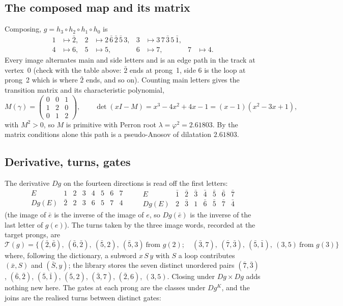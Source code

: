 \documentclass[12pt]{amsart}
\newcommand{\anti}[1]{\bar{#1}}          %
\newcommand{\Dg}{D}                       %
\newcommand{\turns}{\mathcal{T}}
\newcommand{\lam}{\lambda}
\newcommand{\set}[1]{\{#1\}}
\theoremstyle{plain}
\theoremstyle{definition}
\begin{document}
\subsection{The composed map and its matrix}
Composing, $g=h_3\circ h_2\circ h_1\circ h_0$ is
\begin{align*}
  1&\mapsto \anti2, &
  2&\mapsto 2\,\anti6\,\anti2\,\anti5\,3, &
  3&\mapsto 3\,7\,\anti3\,5\,\anti1, \\
  4&\mapsto 6, & 5&\mapsto 5, & 6&\mapsto 7, & 7&\mapsto 4.
\end{align*}
Every image alternates main and side letters and is an edge path in the
track at vertex~0 (check with the table above: $\anti2$ ends at prong~1,
side $6$ is the loop at prong~2 which is where $\anti2$ ends, and so on).
Counting main letters gives the transition matrix and its characteristic
polynomial,
\[
  M(\gamma)=\begin{pmatrix} 0&0&1\\ 1&2&0\\ 0&1&2 \end{pmatrix},
  \qquad
  \det(xI-M)=x^3-4x^2+4x-1=(x-1)(x^2-3x+1),
\]
with $M^2>0$, so $M$ is primitive with Perron root
$\lam=\varphi^2=2.61803$.  By the matrix conditions alone this path is a
pseudo-Anosov of dilatation $2.61803$.

\subsection{Derivative, turns, gates}
The derivative $\Dg g$ on the fourteen directions is read off the first
letters:
\[
  \begin{array}{c|ccccccc}
    E & 1 & 2 & 3 & 4 & 5 & 6 & 7 \\ \hline
    \Dg g(E) & \anti2 & 2 & 3 & 6 & 5 & 7 & 4
  \end{array}
  \qquad
  \begin{array}{c|ccccccc}
    E & \anti1 & \anti2 & \anti3 & \anti4 & \anti5 & \anti6 & \anti7 \\ \hline
    \Dg g(E) & 2 & \anti3 & 1 & \anti6 & \anti5 & \anti7 & \anti4
  \end{array}
\]
(the image of $\anti e$ is the inverse of the image of $e$, so
$\Dg g(\anti e)$ is the inverse of the last letter of $g(e)$).  The turns
taken by the three image words, recorded at the target prongs, are
\[
  \turns(g)=\set{(\anti2,\anti6),\ (\anti6,\anti2),\ (\anti5,2),\ (\anti5,3)\ \text{from } g(2);\quad
  (\anti3,7),\ (\anti7,\anti3),\ (\anti5,\anti1),\ (3,5)\ \text{from } g(3)}
\]
where, following the dictionary, a subword $x\,S\,y$ with $S$ a loop
contributes $(\anti x,S)$ and $(\anti S,y)$; the library stores the seven
distinct unordered pairs $(\anti7,\anti3)$, $(\anti6,\anti2)$,
$(\anti5,\anti1)$, $(\anti5,2)$, $(\anti3,7)$, $(\anti2,6)$, $(3,5)$.
Closing under $\Dg g\times\Dg g$ adds nothing new here.  The gates at
each prong are the classes under $\Dg g^K$, and the joins are the
realised turns between distinct gates:
\end{document}
